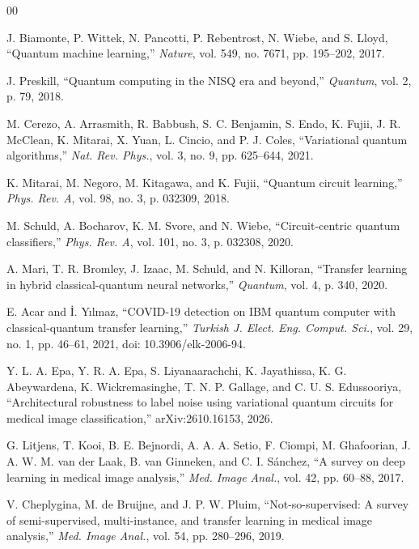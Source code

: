 \documentclass{ieeeaccess}
\begin{document}
\begin{thebibliography}{00}

 J. Biamonte, P. Wittek, N. Pancotti, P. Rebentrost, N. Wiebe, and S. Lloyd, ``Quantum machine learning,'' \emph{Nature}, vol. 549, no. 7671, pp. 195--202, 2017.

 J. Preskill, ``Quantum computing in the NISQ era and beyond,'' \emph{Quantum}, vol. 2, p. 79, 2018.

 M. Cerezo, A. Arrasmith, R. Babbush, S. C. Benjamin, S. Endo, K. Fujii, J. R. McClean, K. Mitarai, X. Yuan, L. Cincio, and P. J. Coles, ``Variational quantum algorithms,'' \emph{Nat. Rev. Phys.}, vol. 3, no. 9, pp. 625--644, 2021.

 K. Mitarai, M. Negoro, M. Kitagawa, and K. Fujii, ``Quantum circuit learning,'' \emph{Phys. Rev. A}, vol. 98, no. 3, p. 032309, 2018.

 M. Schuld, A. Bocharov, K. M. Svore, and N. Wiebe, ``Circuit-centric quantum classifiers,'' \emph{Phys. Rev. A}, vol. 101, no. 3, p. 032308, 2020.

 A. Mari, T. R. Bromley, J. Izaac, M. Schuld, and N. Killoran, ``Transfer learning in hybrid classical-quantum neural networks,'' \emph{Quantum}, vol. 4, p. 340, 2020.

 E. Acar and \.{I}. Y{\i}lmaz, ``COVID-19 detection on IBM quantum computer with classical-quantum transfer learning,'' \emph{Turkish J. Elect. Eng. Comput. Sci.}, vol. 29, no. 1, pp. 46--61, 2021, doi: 10.3906/elk-2006-94.

 Y. L. A. Epa, Y. R. A. Epa, S. Liyanaarachchi, K. Jayathissa, K. G. Abeywardena, K. Wickremasinghe, T. N. P. Gallage, and C. U. S. Edussooriya, ``Architectural robustness to label noise using variational quantum circuits for medical image classification,'' arXiv:2610.16153, 2026.

 G. Litjens, T. Kooi, B. E. Bejnordi, A. A. A. Setio, F. Ciompi, M. Ghafoorian, J. A. W. M. van der Laak, B. van Ginneken, and C. I. S\'anchez, ``A survey on deep learning in medical image analysis,'' \emph{Med. Image Anal.}, vol. 42, pp. 60--88, 2017.

 V. Cheplygina, M. de Bruijne, and J. P. W. Pluim, ``Not-so-supervised: A survey of semi-supervised, multi-instance, and transfer learning in medical image analysis,'' \emph{Med. Image Anal.}, vol. 54, pp. 280--296, 2019.


\end{thebibliography}
\end{document}
